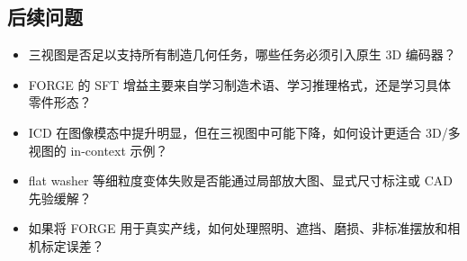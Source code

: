\subsection{后续问题}

\begin{itemize}
    \item 三视图是否足以支持所有制造几何任务，哪些任务必须引入原生 3D 编码器？
    \item FORGE 的 SFT 增益主要来自学习制造术语、学习推理格式，还是学习具体零件形态？
    \item ICD 在图像模态中提升明显，但在三视图中可能下降，如何设计更适合 3D/多视图的 in-context 示例？
    \item flat washer 等细粒度变体失败是否能通过局部放大图、显式尺寸标注或 CAD 先验缓解？
    \item 如果将 FORGE 用于真实产线，如何处理照明、遮挡、磨损、非标准摆放和相机标定误差？
\end{itemize}
